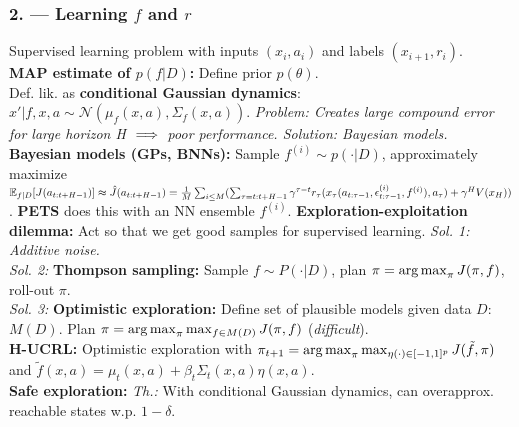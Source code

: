 \subsubsection*{2. --- Learning $f$ and $r$}
Supervised learning problem with inputs $(x_i, a_i)$ and labels
$(x_{i+1}, r_i)$.\\
\textbf{MAP estimate of $p(f|D)$:} Define prior $p(\theta)$.\\ Def. lik. as \textbf{conditional Gaussian dynamics}: $x'|f, x, a \sim \mathcal{N}(\mu_f(x,a), \Sigma_f(x,a))$.
\emph{Problem: Creates large compound error for large horizon H $\color{black}\implies$ poor performance. Solution: Bayesian models.}
\textbf{Bayesian models (GPs, BNNs):} Sample $f^{(i)}\sim p(\cdot|D)$, approximately maximize $\mathbb{E}_{f|D}[J(a_{t:t+H-1})]\approx \hat{J}(a_{t:t+H-1}) = \frac{1}{M}\sum_{i\leq M}(\sum_{\tau=t:t+H-1}\gamma^{\tau-t}r_\tau(x_\tau(a_{t:\tau-1},\epsilon^{(i)}_{t:\tau-1}, f^{(i)}), a_\tau)+\gamma^H V(x_{H}))$. \textbf{PETS} does this with an NN ensemble $f^{(i)}$.
\textbf{Exploration-exploitation dilemma:} Act so that we get good samples for supervised learning. \emph{Sol. 1: Additive noise.}\\
\emph{Sol. 2:} \textbf{Thompson sampling:} Sample $f\sim P(\cdot|D)$, plan $\pi=\operatorname*{arg\,max}_{\pi}J(\pi,f)$, roll-out $\pi$.\\
\emph{Sol. 3:} \textbf{Optimistic exploration:} Define set of plausible models given data $D$: $M(D)$. Plan $\pi = \operatorname*{arg\,max}_\pi \max_{f\in M(D)}J(\pi, f)$ (\emph{difficult}).\\
\textbf{H-UCRL:} Optimistic exploration with $\pi_{t+1} = \operatorname*{arg\,max}_{\pi}\max_{\eta(\cdot)\in[-1,1]^p} J(\tilde{f},\pi)$ and $\tilde{f}(x,a) = \mu_t(x,a) + \beta_{t}\Sigma_{t}(x,a)\eta(x,a)$.\\
\textbf{Safe exploration:} \emph{Th.:} With conditional Gaussian dynamics, can overapprox. reachable states w.p. $1-\delta$.